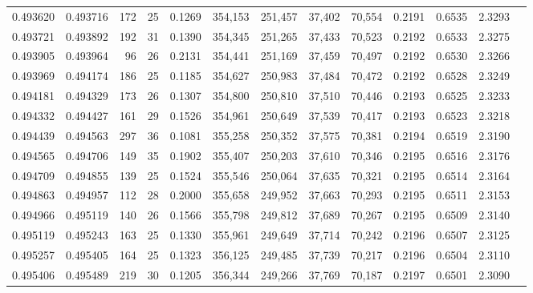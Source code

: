 \begin{tabular}{rrrrrrrrrrrrr}
0.493620 & 0.493716 &   172 &  25 &                                     0.1269 & 354,153 & 251,457 &  37,402 &  70,554 & 0.2191 & 0.6535 & 2.3293 \\
0.493721 & 0.493892 &   192 &  31 &                                     0.1390 & 354,345 & 251,265 &  37,433 &  70,523 & 0.2192 & 0.6533 & 2.3275 \\
0.493905 & 0.493964 &    96 &  26 &                                     0.2131 & 354,441 & 251,169 &  37,459 &  70,497 & 0.2192 & 0.6530 & 2.3266 \\
0.493969 & 0.494174 &   186 &  25 &                                     0.1185 & 354,627 & 250,983 &  37,484 &  70,472 & 0.2192 & 0.6528 & 2.3249 \\
0.494181 & 0.494329 &   173 &  26 &                                     0.1307 & 354,800 & 250,810 &  37,510 &  70,446 & 0.2193 & 0.6525 & 2.3233 \\
0.494332 & 0.494427 &   161 &  29 &                                     0.1526 & 354,961 & 250,649 &  37,539 &  70,417 & 0.2193 & 0.6523 & 2.3218 \\
0.494439 & 0.494563 &   297 &  36 &                                     0.1081 & 355,258 & 250,352 &  37,575 &  70,381 & 0.2194 & 0.6519 & 2.3190 \\
0.494565 & 0.494706 &   149 &  35 &                                     0.1902 & 355,407 & 250,203 &  37,610 &  70,346 & 0.2195 & 0.6516 & 2.3176 \\
0.494709 & 0.494855 &   139 &  25 &                                     0.1524 & 355,546 & 250,064 &  37,635 &  70,321 & 0.2195 & 0.6514 & 2.3164 \\
0.494863 & 0.494957 &   112 &  28 &                                     0.2000 & 355,658 & 249,952 &  37,663 &  70,293 & 0.2195 & 0.6511 & 2.3153 \\
0.494966 & 0.495119 &   140 &  26 &                                     0.1566 & 355,798 & 249,812 &  37,689 &  70,267 & 0.2195 & 0.6509 & 2.3140 \\
0.495119 & 0.495243 &   163 &  25 &                                     0.1330 & 355,961 & 249,649 &  37,714 &  70,242 & 0.2196 & 0.6507 & 2.3125 \\
0.495257 & 0.495405 &   164 &  25 &                                     0.1323 & 356,125 & 249,485 &  37,739 &  70,217 & 0.2196 & 0.6504 & 2.3110 \\
0.495406 & 0.495489 &   219 &  30 &                                     0.1205 & 356,344 & 249,266 &  37,769 &  70,187 & 0.2197 & 0.6501 & 2.3090 \\

\end{tabular}
